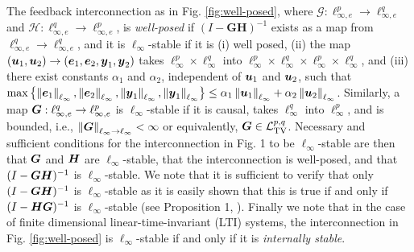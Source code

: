 The feedback interconnection as in Fig. \ref{fig:well-posed}, where $\mathcal{G}: \ell_{\infty,e}^p \to \ell_{\infty,e}^q$ and $\mathcal{H}: \ell_{\infty,e}^q \to \ell_{\infty,e}^p$, is \emph{well-posed} if $(I-\mathbf{GH})^{-1}$ exists as a map from $\ell_{\infty,e}^q \to \ell_{\infty,e}^q$, and it is $\ell_\infty$-stable if it is (i) well posed, (ii) the map $(\boldsymbol{u}_1,\boldsymbol{u}_2) \to (\boldsymbol{e}_1,\boldsymbol{e}_2, \boldsymbol{y}_1, \boldsymbol{y}_2)$ takes $ \ell_{\infty}^p \times \ell_{\infty}^q$ into $\ell_{\infty}^p \times \ell_{\infty}^q \times \ell_{\infty}^p \times \ell_{\infty}^q$, and (iii) there exist constants $\alpha_1$ and $\alpha_2$, independent of $\boldsymbol{u}_1$ and $\boldsymbol{u}_2$, such that $\max\left\{\left\|\boldsymbol{e}_1\right\|_{\ell_\infty},\left\|\boldsymbol{e}_2\right\|_{\ell_\infty},\left\|\boldsymbol{y}_1\right\|_{\ell_\infty},\left\|\boldsymbol{y}_1\right\|_{\ell_\infty}\right\} \leq \alpha_1\left\|\boldsymbol{u}_1\right\|_{\ell_\infty}+\alpha_2\left\|\boldsymbol{u}_2\right\|_{\ell_\infty}$.  Similarly, a map $\boldsymbol{G}:\ell_{\infty,e}^q \to \ell_{\infty,e}^p$ is $\ell_\infty$-stable if it is causal, takes $\ell_\infty^q$ into $\ell_\infty^p$, and is bounded, i.e., $\left\|\boldsymbol{G}\right\|_{\ell_\infty\to\ell_\infty} < \infty$ or equivalently, $\boldsymbol{G} \in \mathcal{L}_{\mathrm{TV}}^{p,q}$.  Necessary and sufficient conditions for the interconnection in Fig. 1 to be $\ell_\infty$-stable are then that $\boldsymbol{G}$ and $\boldsymbol{H}$ are $\ell_\infty$-stable, that the interconnection is well-posed, and that $(I-\boldsymbol{G} \boldsymbol{H})^{-1}$ is $\ell_\infty$-stable.  We note that it is sufficient to verify that only $(I-\boldsymbol{G} \boldsymbol{H})^{-1}$ is $\ell_\infty$-stable as it is easily shown that this is true if and only if $(I-\boldsymbol{H} \boldsymbol{G})^{-1}$ is $\ell_\infty$-stable (see Proposition 1, \cite{khammash1990stability}).  Finally we note that in the case of finite dimensional linear-time-invariant (LTI) systems, the interconnection in Fig. \ref{fig:well-posed} is $\ell_\infty$-stable if and only if it is \emph{internally stable}.


